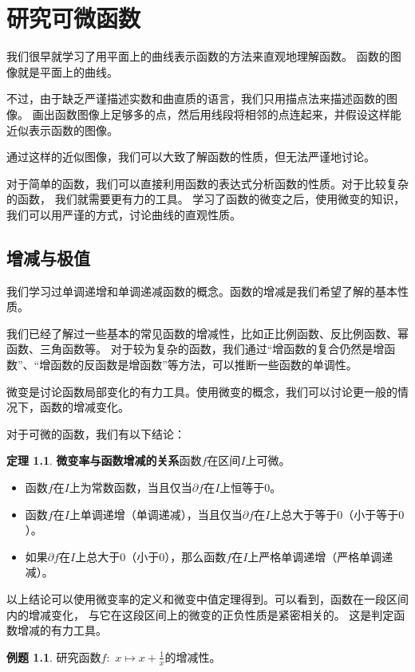 \documentclass[12pt,UTF8]{ctexbook}
\theoremstyle{definition}
\newtheorem{tm}{定理}[section]
\newtheorem{et}{例题}[section]
\theoremstyle{plain}
\begin{document}
\chapter{研究可微函数}

我们很早就学习了用平面上的曲线表示函数的方法来直观地理解函数。
函数的图像就是平面上的曲线。

不过，由于缺乏严谨描述实数和曲直质的语言，我们只用描点法来描述函数的图像。
画出函数图像上足够多的点，然后用线段将相邻的点连起来，并假设这样能近似表示函数的图像。

通过这样的近似图像，我们可以大致了解函数的性质，但无法严谨地讨论。

对于简单的函数，我们可以直接利用函数的表达式分析函数的性质。对于比较复杂的函数，
我们就需要更有力的工具。
学习了函数的微变之后，使用微变的知识，我们可以用严谨的方式，讨论曲线的直观性质。

\section{增减与极值}

我们学习过单调递增和单调递减函数的概念。函数的增减是我们希望了解的基本性质。

我们已经了解过一些基本的常见函数的增减性，比如正比例函数、反比例函数、幂函数、三角函数等。
对于较为复杂的函数，我们通过“增函数的复合仍然是增函数”、“增函数的反函数是增函数”等方法，可以推断一些函数的单调性。

微变是讨论函数局部变化的有力工具。使用微变的概念，我们可以讨论更一般的情况下，函数的增减变化。

对于可微的函数，我们有以下结论：
\begin{tm}{\textbf{微变率与函数增减的关系}}\label{tm:3-1-0}
    函数$f$在区间$I$上可微。
    \begin{itemize}
        \item 函数$f$在$I$上为常数函数，当且仅当$\partial f$在$I$上恒等于$0$。
        \item 函数$f$在$I$上单调递增（单调递减），当且仅当$\partial f$在$I$上总大于等于$0$（小于等于$0$）。
        \item 如果$\partial f$在$I$上总大于$0$（小于$0$），那么函数$f$在$I$上严格单调递增（严格单调递减）。
    \end{itemize} 
\end{tm}
以上结论可以使用微变率的定义和微变中值定理得到。可以看到，函数在一段区间内的增减变化，
与它在这段区间上的微变的正负性质是紧密相关的。
这是判定函数增减的有力工具。

\begin{et}
    研究函数$f:\,\,x\mapsto x + \frac{1}{x}$的增减性。
\end{et}
\end{document}
